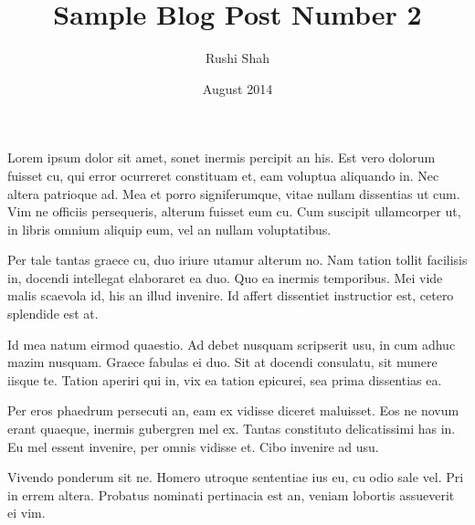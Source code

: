 \documentclass{article}
\title{Sample Blog Post Number 2}
\author{Rushi Shah}
\date{August 2014}
\begin{document}
	\maketitle

	Lorem ipsum dolor sit amet, sonet inermis percipit an his. Est vero dolorum fuisset cu, qui error ocurreret constituam et, eam voluptua aliquando in. Nec altera patrioque ad. Mea et porro signiferumque, vitae nullam dissentias ut cum. Vim ne officiis persequeris, alterum fuisset eum cu. Cum suscipit ullamcorper ut, in libris omnium aliquip eum, vel an nullam voluptatibus.

        Per tale tantas graece cu, duo iriure utamur alterum no. Nam tation tollit facilisis in, docendi intellegat elaboraret ea duo. Quo ea inermis temporibus. Mei vide malis scaevola id, his an illud invenire. Id affert dissentiet instructior est, cetero splendide est at.

        Id mea natum eirmod quaestio. Ad debet nusquam scripserit usu, in cum adhuc mazim nusquam. Graece fabulas ei duo. Sit at docendi consulatu, sit munere iisque te. Tation aperiri qui in, vix ea tation epicurei, sea prima dissentias ea.

        Per eros phaedrum persecuti an, eam ex vidisse diceret maluisset. Eos ne novum erant quaeque, inermis gubergren mel ex. Tantas constituto delicatissimi has in. Eu mel essent invenire, per omnis vidisse et. Cibo invenire ad usu.

        Vivendo ponderum sit ne. Homero utroque sententiae ius eu, cu odio sale vel. Pri in errem altera. Probatus nominati pertinacia est an, veniam lobortis assueverit ei vim.
\end{document}
